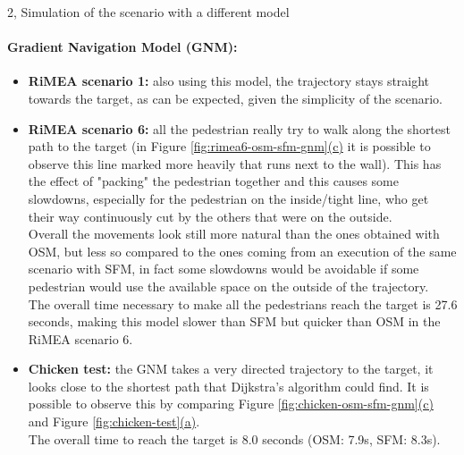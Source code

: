 \documentclass[10pt,a4paper]{article}
\begin{document}
\begin{task}{2, Simulation of the scenario with a different model}
\paragraph{Gradient Navigation Model (GNM):}
\begin{itemize}
    \item \textbf{RiMEA scenario 1:} also using this model, the trajectory stays straight towards the target, as can be expected, given the simplicity of the scenario.
    
    \item \textbf{RiMEA scenario 6:} all the pedestrian really try to walk along the shortest path to the target (in Figure \hyperref[fig:rimea6-osm-sfm-gnm]{\ref{fig:rimea6-osm-sfm-gnm}(c)} it is possible to observe this line marked more heavily that runs next to the wall).
    This has the effect of "packing" the pedestrian together and this causes some slowdowns, especially for the pedestrian on the inside/tight line, who get their way continuously cut by the others that were on the outside.\\
    Overall the movements look still more natural than the ones obtained with OSM, but less so compared to the ones coming from an execution of the same scenario with SFM, in fact some slowdowns would be avoidable if some pedestrian would use the available space on the outside of the trajectory.\\
    The overall time necessary to make all the pedestrians reach the target is 27.6 seconds, making this model slower than SFM but quicker than OSM in the RiMEA scenario 6.
    
    \item \textbf{Chicken test:} the GNM takes a very directed trajectory to the target, it looks close to the shortest path that Dijkstra's algorithm could find.
    It is possible to observe this by comparing Figure \hyperref[fig:chicken-osm-sfm-gnm]{\ref{fig:chicken-osm-sfm-gnm}(c)} and Figure \hyperref[fig:chicken-test]{\ref{fig:chicken-test}(a)}.\\
    The overall time to reach the target is 8.0 seconds (OSM: 7.9s, SFM: 8.3s).
\end{itemize}


\end{task}
\end{document}
